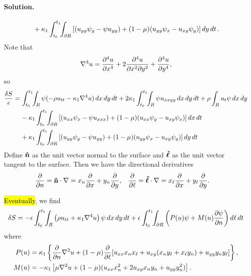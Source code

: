 \documentclass[11pt]{article}
\newcommand{\beq}{\begin{equation*}}
\newcommand{\eeq}{\end{equation*}}
\newenvironment{solution}
{
    \paragraph{Solution.}
    \ignorespaces
}
{
}
\begin{document}
\begin{solution}
\begin{align*}
		&\phantom{=\ } + \kappa_1 \int_{t_0}^{t_1} \!\!\int_{\partial R} \left[ (u_{yy} \psi_{y} - \psi u_{yy}) + (1 - \mu) (u_{yy} \psi_{x} - u_{xy} \psi_{y}) \right] \dd{y} \dd{t}.
	\end{align*}
	Note that
	\beq
		\lapw u = \pdv[4]{u}{x} + 2 \frac{\partial^4 u}{\partial x^2 \partial y^2} + \pdv[4]{u}{y},
	\eeq
	so
	\begin{align*}
		\frac{\dS}{\eps} &= \inttr \psi (-\rho \utt - \kaq \lapw u) \drt + 2 \kaq \inttr \psi \uxxyy \drt + \rho \intr \ut \psi \dd{x} \dd{y} \\
		&\phantom{=\ } - \kaq \inttdr \left[ (\uxx \psix - \psi \uxxx) + (1 - \mu) (\uxx \psiy - \uxy \psix) \right] \dd{x} \dd{t} \\
		&\phantom{=\ } + \kaq \inttdr \left[ (\uyy \psiy - \psi \uyy) + (1 - \mu) (\uyy \psix - \uxy \psiy) \right] \dd{y} \dd{t}
	\end{align*}
	Define $\mathbf{\hat{n}}$ as the unit vector normal to the surface and $\boldsymbol{\hat{\ell}}$ as the unit vector tangent to the surface.  Then we have the directional derivatives
	\begin{align*}
		\pdv{}{n} &= \mathbf{\hat{n}} \cdot \nabla = x_n \pdv{}{x} + y_n \pdv{}{y}, &
		\pdv{}{\ell} &= \boldsymbol{\hat{\ell}} \cdot \nabla = x_\ell \pdv{}{x} + y_\ell \pdv{}{y}.
	\end{align*}
	
	\hl{Eventually}, we find
	\beq
		\dS = -\eps \inttr \left(\rho \utt + \kaq \lapw u \right) \psi \drt + \eps \inttdr \left( \Pu \psi + \Mu \pdv{\psi}{n} \right) \dlt
	\eeq
	where
	\begin{align*}
		P(u) &= \kappa_1 \left\{ \pdv{}{n} \nabla^2 u + (1 - \mu) \pdv{}{\ell} [u_{xx} x_n x_\ell + u_{xy} (x_n y_\ell + x_\ell y_n) + u_{yy} y_n y_\ell] \right\}, \\
		M(u) &= -\kappa_1 \left[ \mu \nabla^2 u + (1 - \mu) (u_{xx} x_n^2 + 2 u_{xy} x_n y_n + u_{yy} y_n^2) \right].
	\end{align*}


\end{solution}
\end{document}
